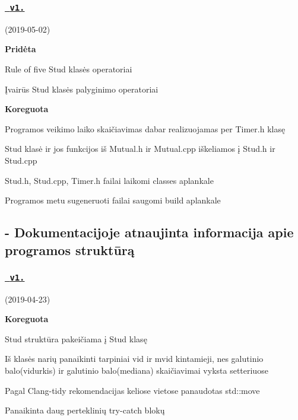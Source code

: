  \subsubsection*{\href{https://github.com/gitguuddd/Obj_Duomenu_Apdorojimas_class/releases/tag/v1.2}{\texttt{ v1.}}}

(2019-\/05-\/02)



{\bfseries{Pridėta}}
\begin{DoxyItemize}
\item {\ttfamily Rule of five} {\ttfamily Stud} klasės operatoriai
\item Įvairūs {\ttfamily Stud} klasės palyginimo operatoriai
\end{DoxyItemize}

{\bfseries{Koreguota}}
\begin{DoxyItemize}
\item Programos veikimo laiko skaičiavimas dabar realizuojamas per {\ttfamily Timer.\+h} klasę
\item Stud klasė ir jos funkcijos iš {\ttfamily Mutual.\+h} ir {\ttfamily Mutual.\+cpp} iškeliamos į {\ttfamily Stud.\+h} ir {\ttfamily Stud.\+cpp}
\item {\ttfamily Stud.\+h, Stud.\+cpp, Timer.\+h} failai laikomi classes aplankale
\item Programos metu sugeneruoti failai saugomi {\ttfamily build} aplankale \subsection*{-\/ Dokumentacijoje atnaujinta informacija apie programos struktūrą }
\end{DoxyItemize}

\subsubsection*{\href{https://github.com/gitguuddd/Obj_Duomenu_Apdorojimas_class/releases/tag/v1.1}{\texttt{ v1.}}}

(2019-\/04-\/23)

{\bfseries{Koreguota}}
\begin{DoxyItemize}
\item {\ttfamily Stud} struktūra pakeičiama į {\ttfamily Stud} klasę
\item Iš klasės narių panaikinti tarpiniai {\ttfamily vid} ir {\ttfamily mvid} kintamieji, nes galutinio balo(vidurkis) ir galutinio balo(mediana) skaičiavimai vyksta setteriuose
\item Pagal {\ttfamily Clang-\/tidy} rekomendacijas keliose vietose panaudotas {\ttfamily std\+::move}
\item Panaikinta daug perteklinių try-\/catch blokų
\end{DoxyItemize}

